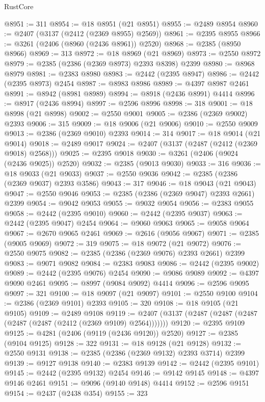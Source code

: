 \begin{lexlean}{RustCore}
\begin{coremodule}
@8951 := 311
@8954 := @18 @8951 (@21 @8951)
@8955 := @2489 @8954
@8960 := @2407 (@3137 (@2412 (@2369 @8955) @2569))
@8961 := @2395 @8955
@8966 := @3261 (@2406 (@8960 (@2436 @8961)) @2520)
@8968 := @2385 (@8950 @8966)
@8969 := 313
@8972 := @18 @8969 (@21 @8969)
@8973 := @2550 @8972
@8979 := @2385 (@2386 (@2369 @8973) @2393 @8398) @2399
@8980 := @8968 @8979
@8981 := @2383 @8980
@8983 := @2442 (@2395 @8947)
@8986 := @2442 (@2395 @8973) @2454
@8987 := @8983 @8986
@8989 := @4397 @8987 @2461
@8991 := @8942 (@8981 @8989)
@8994 := @8918 (@2436 @8991) @4414
@8996 := @8917 (@2436 @8994)
@8997 := @2596 @8996
@8998 := 318
@9001 := @18 @8998 (@21 @8998)
@9002 := @2550 @9001
@9005 := @2386 (@2369 @9002) @2393
@9006 := 315
@9009 := @18 @9006 (@21 @9006)
@9010 := @2550 @9009
@9013 := @2386 (@2369 @9010) @2393
@9014 := 314
@9017 := @18 @9014 (@21 @9014)
@9018 := @2489 @9017
@9024 := @2407 (@3137 (@2487 (@2412 (@2369 @9018) @2568)))
@9025 := @2395 @9018
@9030 := @3261 (@2406 (@9024 (@2436 @9025)) @2520)
@9032 := @2385 (@9013 @9030)
@9033 := 316
@9036 := @18 @9033 (@21 @9033)
@9037 := @2550 @9036
@9042 := @2385 (@2386 (@2369 @9037) @2393 @3586)
@9043 := 317
@9046 := @18 @9043 (@21 @9043)
@9047 := @2550 @9046
@9053 := @2385 (@2386 (@2369 @9047) @2393 @2661) @2399
@9054 := @9042 @9053
@9055 := @9032 @9054
@9056 := @2383 @9055
@9058 := @2442 (@2395 @9010)
@9060 := @2442 (@2395 @9037)
@9063 := @2442 (@2395 @9047) @2454
@9064 := @9060 @9063
@9065 := @9058 @9064
@9067 := @2670 @9065 @2461
@9069 := @2616 (@9056 @9067)
@9071 := @2385 (@9005 @9069)
@9072 := 319
@9075 := @18 @9072 (@21 @9072)
@9076 := @2550 @9075
@9082 := @2385 (@2386 (@2369 @9076) @2393 @2661) @2399
@9083 := @9071 @9082
@9084 := @2383 @9083
@9086 := @2442 (@2395 @9002)
@9089 := @2442 (@2395 @9076) @2454
@9090 := @9086 @9089
@9092 := @4397 @9090 @2461
@9095 := @8997 (@9084 @9092) @4414
@9096 := @2596 @9095
@9097 := 321
@9100 := @18 @9097 (@21 @9097)
@9101 := @2550 @9100
@9104 := @2386 (@2369 @9101) @2393
@9105 := 320
@9108 := @18 @9105 (@21 @9105)
@9109 := @2489 @9108
@9119 := @2407 (@3137 (@2487 (@2487 (@2487 (@2487 (@2487 (@2412 (@2369 @9109) @2564)))))))
@9120 := @2395 @9109
@9125 := @4281 (@2406 (@9119 (@2436 @9120)) @2520)
@9127 := @2385 (@9104 @9125)
@9128 := 322
@9131 := @18 @9128 (@21 @9128)
@9132 := @2550 @9131
@9138 := @2385 (@2386 (@2369 @9132) @2393 @3714) @2399
@9139 := @9127 @9138
@9140 := @2383 @9139
@9142 := @2442 (@2395 @9101)
@9145 := @2442 (@2395 @9132) @2454
@9146 := @9142 @9145
@9148 := @4397 @9146 @2461
@9151 := @9096 (@9140 @9148) @4414
@9152 := @2596 @9151
@9154 := @2437 (@2438 @354)
@9155 := 323

\end{coremodule}
\end{lexlean}
